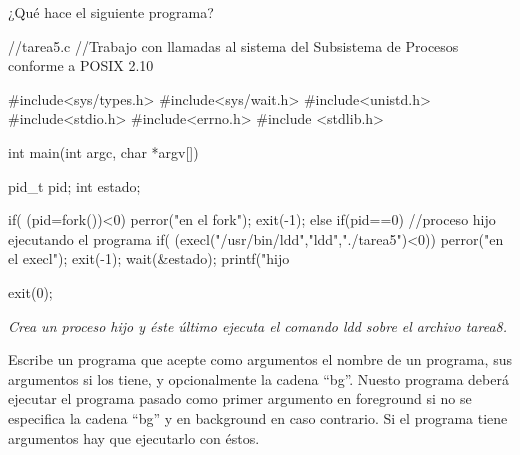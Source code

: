 \begin{exercise}
¿Qué hace el siguiente programa?
\begin{cppcode}
//tarea5.c
//Trabajo con llamadas al sistema del Subsistema de Procesos conforme a POSIX 2.10

#include<sys/types.h>	
#include<sys/wait.h>	
#include<unistd.h>
#include<stdio.h>
#include<errno.h>
#include <stdlib.h>


int main(int argc, char *argv[])
{
pid_t pid;
int estado;

if( (pid=fork())<0) {
	perror("\nError en el fork");
	exit(-1);
}
else if(pid==0) {  //proceso hijo ejecutando el programa
	if( (execl("/usr/bin/ldd","ldd","./tarea5")<0)) {
		perror("\nError en el execl");
		exit(-1);
	}
}
wait(&estado);
printf("\nMi hijo %

exit(0);

}
\end{cppcode}
\emph{Crea un proceso hijo y éste último ejecuta el comando ldd sobre el archivo tarea8.}
\end{exercise}
\begin{exercise}
Escribe un programa que acepte como argumentos el nombre de un programa,
sus argumentos si los tiene, y opcionalmente la cadena “bg”. Nuesto programa deberá
ejecutar el programa pasado como primer argumento en foreground si no se especifica la
cadena “bg” y en background en caso contrario. Si el programa tiene argumentos hay que
ejecutarlo con éstos.
\end{exercise}
